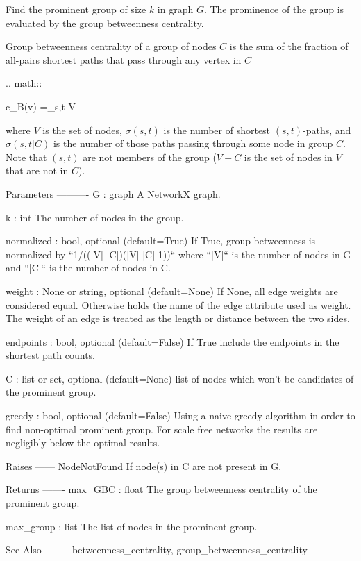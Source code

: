 \begin{DoxyVerb}Find the prominent group of size $k$ in graph $G$. The prominence of the
group is evaluated by the group betweenness centrality.

Group betweenness centrality of a group of nodes $C$ is the sum of the
fraction of all-pairs shortest paths that pass through any vertex in $C$

.. math::

   c_B(v) =\sum_{s,t \in V} 

where $V$ is the set of nodes, $\sigma(s, t)$ is the number of
shortest $(s, t)$-paths, and $\sigma(s, t|C)$ is the number of
those paths passing through some node in group $C$. Note that
$(s, t)$ are not members of the group ($V-C$ is the set of nodes
in $V$ that are not in $C$).

Parameters
----------
G : graph
   A NetworkX graph.

k : int
   The number of nodes in the group.

normalized : bool, optional (default=True)
   If True, group betweenness is normalized by ``1/((|V|-|C|)(|V|-|C|-1))``
   where ``|V|`` is the number of nodes in G and ``|C|`` is the number of
   nodes in C.

weight : None or string, optional (default=None)
   If None, all edge weights are considered equal.
   Otherwise holds the name of the edge attribute used as weight.
   The weight of an edge is treated as the length or distance between the two sides.

endpoints : bool, optional (default=False)
   If True include the endpoints in the shortest path counts.

C : list or set, optional (default=None)
   list of nodes which won't be candidates of the prominent group.

greedy : bool, optional (default=False)
   Using a naive greedy algorithm in order to find non-optimal prominent
   group. For scale free networks the results are negligibly below the optimal
   results.

Raises
------
NodeNotFound
   If node(s) in C are not present in G.

Returns
-------
max_GBC : float
   The group betweenness centrality of the prominent group.

max_group : list
    The list of nodes in the prominent group.

See Also
--------
betweenness_centrality, group_betweenness_centrality


\end{DoxyVerb}
